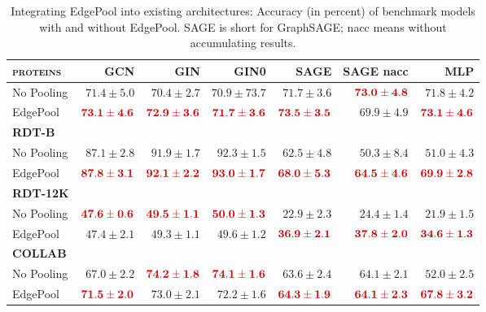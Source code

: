 \documentclass{article}
\newcommand{\edgepool}{EdgePool}
\newcommand{\datasetname}[1]{\textsc{#1}}
\newcommand{\best}[1]{\mathbf{\textcolor{bestcolor}{#1}}}
\begin{document}
\begin{table}
	\centering
	\caption{Integrating \edgepool{} into existing architectures: Accuracy (in percent) of benchmark models with and without \edgepool{}. SAGE is short for GraphSAGE; nacc means without accumulating results.} 


\begin{tabular}{lrrrrrr}
	\toprule
	\textbf{\datasetname{proteins}} & GCN              & GIN                   & GIN0                      & SAGE                  & SAGE nacc              & MLP \\ \midrule
	No Pooling                 & $71.4 \pm 5.0$        & $70.4 \pm 2.7$        & $70.9 \pm 73.7$           & $71.7 \pm 3.6$        & $\best{73.0 \pm 4.8}$ & $71.8 \pm 4.2$\\
	\edgepool{}                & $\best{73.1 \pm 4.6}$ & $\best{72.9 \pm 3.6}$ & $\best{71.7 \pm 3.6}$     & $\best{73.5 \pm 3.5}$ & $69.9 \pm 4.9$        & $\best{73.1 \pm 4.6}$\\
	
	\toprule
	\textbf{\datasetname{RDT-B}} &&&&&&\\ \midrule
	No Pooling                 & $87.1 \pm 2.8$        & $91.9 \pm 1.7$        & $92.3 \pm 1.5$            & $62.5 \pm 4.8$        & $50.3 \pm 8.4$        & $51.0 \pm 4.3$\\
	\edgepool{}                & $\best{87.8 \pm 3.1}$ & $\best{92.1 \pm 2.2}$ & $\best{93.0 \pm 1.7}$     & $\best{68.0 \pm 5.3}$ & $\best{64.5 \pm 4.6}$ & $\best{69.9 \pm 2.8}$\\
	
	\toprule
	\textbf{\datasetname{RDT-12K}} & &&&&& \\ \midrule
	No Pooling                 & $\best{47.6 \pm 0.6}$ & $\best{49.5 \pm 1.1}$ & $\best{50.0 \pm 1.3}$     & $22.9 \pm 2.3$        & $24.4 \pm 1.4$        & $21.9 \pm 1.5$\\
	\edgepool{}                & $47.4 \pm 2.1$        & $49.3 \pm 1.1$        & $49.6 \pm 1.2$            & $\best{36.9 \pm 2.1}$ & $\best{37.8 \pm 2.0}$ & $\best{34.6 \pm 1.3}$\\
	
	\toprule
	\textbf{\datasetname{COLLAB}} & &&&&&\\ \midrule
	No Pooling                 & $67.0 \pm 2.2$   & $\best{74.2 \pm 1.8}$ & $\best{74.1 \pm 1.6}$ & $63.6 \pm 2.4$ & $64.1 \pm 2.1$ & $52.0 \pm 2.5$\\
	\edgepool{}                & $\best{71.5 \pm 2.0}$   & $73.0 \pm 2.1$ & $72.2 \pm 1.6$      & $\best{64.3 \pm 1.9}$ & $\best{64.1 \pm 2.3}$ & $\best{67.8 \pm 3.2}$\\

\end{tabular} 	\label{tab:results_benchmarks}
\end{table}
\end{document}
